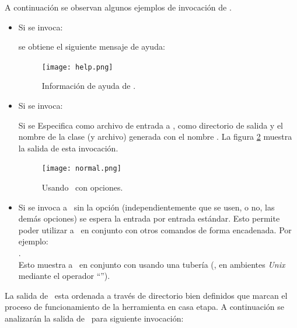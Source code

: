 A continuación se observan algunos ejemplos de invocación de \maggen.
\begin{itemize}
\item Si se invoca:
\begin{center} {\small{}}\end{center} se obtiene el siguiente mensaje de ayuda:

\begin{figure}[!ht]\centering
\texttt{[image: help.png]}
\caption{\label{fig:outhelp} Información de ayuda de \maggen.}
\end{figure}

\item Si se invoca:  \begin{center}
{\scriptsize{}}                                                                                                                                   \end{center} Si se Especifica como archivo de entrada a , como directorio de salida  y el nombre de la clase (y archivo) generada con el nombre . La figura \ref{fig:outnormal} muestra la salida de esta invocación.

\begin{figure}[!ht]\centering
\texttt{[image: normal.png]}
\caption{\label{fig:outnormal} Usando \maggen\ con opciones.}
\end{figure}

\item Si se invoca a \maggen\ sin la opción  (independientemente que se usen, o no, las demás opciones) se espera la entrada por entrada estándar. Esto permite poder utilizar a \maggen\ en conjunto con otros comandos de forma encadenada. Por ejemplo:\\

.\\

Esto muestra a \maggen\ en conjunto con  usando una tubería (, en ambientes \textit{Unix} mediante el operador ``\textbtt{|}'').

\end{itemize}

La salida de \maggen\ esta ordenada a través de directorio bien definidos que marcan el proceso de funcionamiento de la herramienta en casa etapa. A continuación se analizarán la salida de \maggen\ para siguiente invocación:

